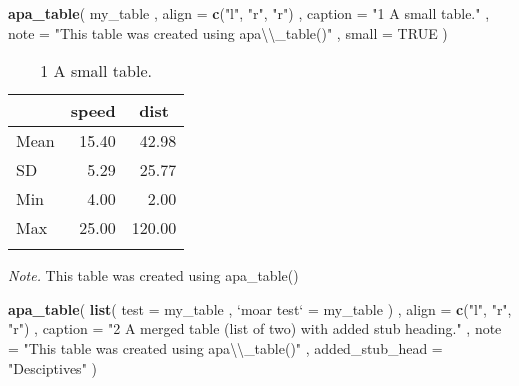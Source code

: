 \documentclass[english,man]{apa6}
\newenvironment{Shaded}{\begin{snugshade}}{\end{snugshade}}
\newcommand{\KeywordTok}[1]{\textcolor[rgb]{0.13,0.29,0.53}{\textbf{#1}}}
\newcommand{\DataTypeTok}[1]{\textcolor[rgb]{0.13,0.29,0.53}{#1}}
\newcommand{\CharTok}[1]{\textcolor[rgb]{0.31,0.60,0.02}{#1}}
\newcommand{\StringTok}[1]{\textcolor[rgb]{0.31,0.60,0.02}{#1}}
\newcommand{\OtherTok}[1]{\textcolor[rgb]{0.56,0.35,0.01}{#1}}
\newcommand{\NormalTok}[1]{#1}
\theoremstyle{definition}
\theoremstyle{definition}
\theoremstyle{definition}
\theoremstyle{remark}
\begin{document}
\begin{Shaded}
\begin{Highlighting}[]
\KeywordTok{apa_table}\NormalTok{(}
\NormalTok{  my_table}
\NormalTok{  , }\DataTypeTok{align =} \KeywordTok{c}\NormalTok{(}\StringTok{"l"}\NormalTok{, }\StringTok{"r"}\NormalTok{, }\StringTok{"r"}\NormalTok{)}
\NormalTok{  , }\DataTypeTok{caption =} \StringTok{"1 A small table."}
\NormalTok{  , }\DataTypeTok{note =} \StringTok{"This table was created using apa}\CharTok{\textbackslash{}\textbackslash{}}\StringTok{_table()"}
\NormalTok{  , }\DataTypeTok{small =} \OtherTok{TRUE}
\NormalTok{)}
\end{Highlighting}
\end{Shaded}

\begin{table}[tbp]
\begin{center}
\begin{threeparttable}
\caption{\label{tab:unnamed-chunk-2}1 A small table.}
\small{
\begin{tabular}{lrr}
\toprule
 & \multicolumn{1}{c}{speed} & \multicolumn{1}{c}{dist}\\
\midrule
Mean & 15.40 & 42.98\\
SD & 5.29 & 25.77\\
Min & 4.00 & 2.00\\
Max & 25.00 & 120.00\\
\bottomrule
\addlinespace
\end{tabular}
}
\begin{tablenotes}[para]
\textit{Note.} This table was created using apa\_table()
\end{tablenotes}
\end{threeparttable}
\end{center}
\end{table}

\begin{Shaded}
\begin{Highlighting}[]
\KeywordTok{apa_table}\NormalTok{(}
  \KeywordTok{list}\NormalTok{(}
    \DataTypeTok{test =}\NormalTok{ my_table}
\NormalTok{    , }\StringTok{`}\DataTypeTok{moar test}\StringTok{`}\NormalTok{ =}\StringTok{ }\NormalTok{my_table}
\NormalTok{  )}
\NormalTok{  , }\DataTypeTok{align =} \KeywordTok{c}\NormalTok{(}\StringTok{"l"}\NormalTok{, }\StringTok{"r"}\NormalTok{, }\StringTok{"r"}\NormalTok{)}
\NormalTok{  , }\DataTypeTok{caption =} \StringTok{"2 A merged table (list of two) with added stub heading."}
\NormalTok{  , }\DataTypeTok{note =} \StringTok{"This table was created using apa}\CharTok{\textbackslash{}\textbackslash{}}\StringTok{_table()"}
\NormalTok{  , }\DataTypeTok{added_stub_head =} \StringTok{"Desciptives"}
\NormalTok{)}
\end{Highlighting}
\end{Shaded}
\end{document}
